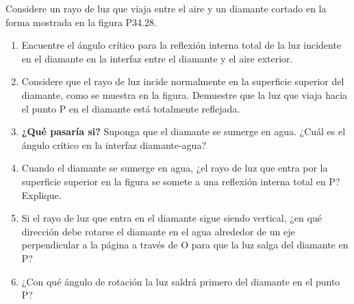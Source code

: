 \item Considere un rayo de luz que viaja entre el aire y un diamante cortado en la forma mostrada en la figura P34.28.
\begin{enumerate}
    \item Encuentre el ángulo crítico para la reflexión interna total de la luz incidente en el diamante en la interfaz entre el diamante y el aire exterior.
    \item Considere que el rayo de luz incide normalmente en la superficie superior del diamante, como se muestra en la figura. Demuestre que la luz que viaja hacia el punto P en el diamante está totalmente reflejada.
    \item \textbf{¿Qué pasaría si?} Suponga que el diamante se sumerge en agua. ¿Cuál es el ángulo crítico en la interfaz diamante-agua?
    \item Cuando el diamante se sumerge en agua, ¿el rayo de luz que entra por la superficie superior en la figura se somete a una reflexión interna total en P? Explique.
    \item Si el rayo de luz que entra en el diamante sigue siendo vertical, ¿en qué dirección debe rotarse el diamante en el agua alrededor de un eje perpendicular a la página a través de O para que la luz salga del diamante en P?
    \item ¿Con qué ángulo de rotación la luz saldrá primero del diamante en el punto P?
\end{enumerate}
